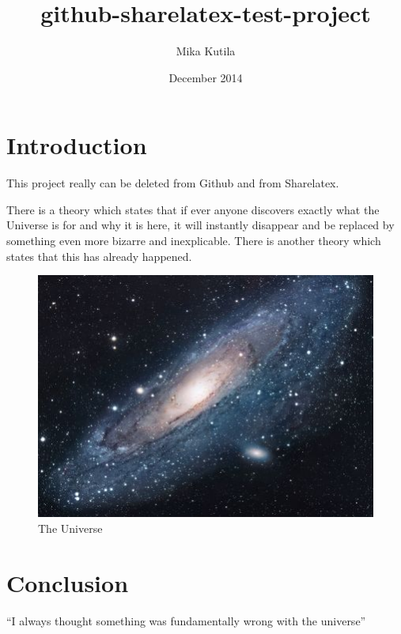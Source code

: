 \documentclass{article}
\title{github-sharelatex-test-project}
\author{Mika Kutila}
\date{December 2014}
\begin{document}
\maketitle

\section{Introduction}
This project really can be deleted from Github and from Sharelatex.

There is a theory which states that if ever anyone discovers exactly what the Universe is for and why it is here, it will instantly disappear and be replaced by something even more bizarre and inexplicable.
There is another theory which states that this has already happened.

\begin{figure}[h!]
\centering
\includegraphics[scale=1.7]{universe.jpg}
\caption{The Universe}
\label{fig:univerise}
\end{figure}

\section{Conclusion}
``I always thought something was fundamentally wrong with the universe'' \citep{adams1995hitchhiker}



\end{document}
